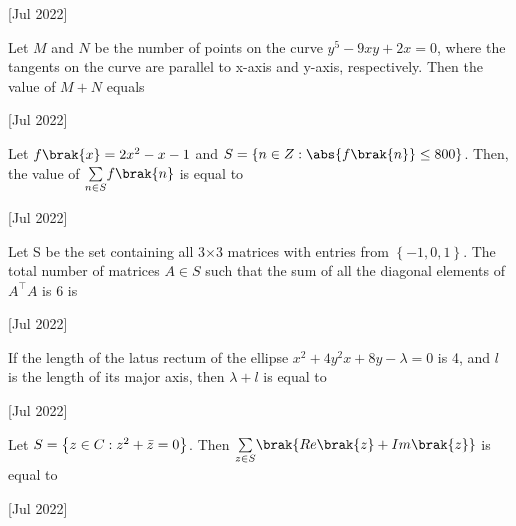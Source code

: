     \hfill{[Jul 2022]}
        
    \item Let $M$ and $N$ be the number of points on the curve $y^5-9xy+2x=0$, where the tangents on the curve are parallel to x-axis and y-axis, respectively. Then the value of $M+N$ equals
    
    \hfill{[Jul 2022]}

    \item Let $f\brak{x}=2x^2-x-1$ and $S=\left\{ n\in Z:\abs{f\brak{n}}\leq800 \right\}$. Then, the value of $\underset{n\in S}{\sum}f\brak{n}$ is equal to
    
    \hfill{[Jul 2022]}
        
    \item Let S be the set containing all 3$\times$3 matrices with entries from $\left\{ -1,0,1 \right\}$. The total number of matrices $A\in S$ such that the sum of all the diagonal elements of $A^\top A$ is 6 is
    
    \hfill{[Jul 2022]}

    \item If the length of the latus rectum of the ellipse $x^2+4y^2x+8y-\lambda=0$ is 4, and $l$ is the length of its major axis, then $\lambda+l$ is equal to
    
    \hfill{[Jul 2022]}

    \item Let $S=\left\{ z\in C:z^2+\Bar{z}=0 \right\}$. Then $\underset{z\in S}{\sum}\brak{Re\brak{z}+Im\brak{z}}$ is equal to
    
    \hfill{[Jul 2022]}


